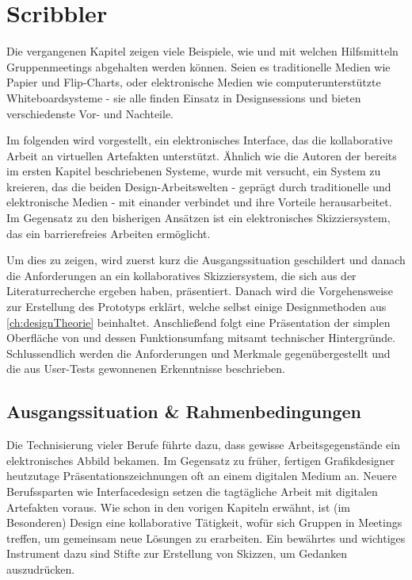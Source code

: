 \chapter{Scribbler}\label{ch:scribbler} 

Die vergangenen Kapitel zeigen viele Beispiele, wie und mit welchen Hilfsmitteln Gruppenmeetings abgehalten werden können. Seien es traditionelle Medien wie Papier und Flip-Charts, oder elektronische Medien wie computerunterstützte Whiteboardsysteme - sie alle finden Einsatz in Designsessions und bieten verschiedenste Vor- und Nachteile.

\medskip Im folgenden wird \scribbler vorgestellt, ein elektronisches Interface, das die kollaborative Arbeit an virtuellen Artefakten unterstützt. Ähnlich wie die Autoren der bereits im ersten Kapitel beschriebenen Systeme, wurde mit \scribbler versucht, ein System zu kreieren, das die beiden Design-Arbeitswelten - geprägt durch traditionelle und elektronische Medien - mit einander verbindet und ihre Vorteile herausarbeitet. Im Gegensatz zu den bisherigen Ansätzen ist \scribbler ein elektronisches Skizziersystem, das ein barrierefreies Arbeiten ermöglicht.

\medskip Um dies zu zeigen, wird zuerst kurz die Ausgangssituation geschildert und danach die Anforderungen an ein kollaboratives Skizziersystem, die sich aus der Literaturrecherche ergeben haben, präsentiert. Danach wird die Vorgehensweise zur Erstellung des Prototyps erklärt, welche selbst einige Designmethoden aus \autoref{ch:designTheorie} beinhaltet. Anschließend folgt eine Präsentation der simplen Oberfläche von \scribbler und dessen Funktionsumfang mitsamt technischer Hintergründe. Schlussendlich werden die Anforderungen und Merkmale gegenübergestellt und die aus User-Tests gewonnenen Erkenntnisse beschrieben.

\section{Ausgangssituation \& Rahmenbedingungen} \label{sec:ausgangssituation} 
Die Technisierung vieler Berufe führte dazu, dass gewisse Arbeitsgegenstände ein elektronisches Abbild bekamen. Im Gegensatz zu früher, fertigen Grafikdesigner heutzutage Präsentationszeichnungen oft an einem digitalen Medium an. Neuere Berufssparten wie Interfacedesign setzen die tagtägliche Arbeit mit digitalen Artefakten voraus. Wie schon in den vorigen Kapiteln erwähnt, ist (im Besonderen) Design eine kollaborative Tätigkeit, wofür sich Gruppen in Meetings treffen, um gemeinsam neue Lösungen zu erarbeiten. Ein bewährtes und wichtiges Instrument dazu sind Stifte zur Erstellung von Skizzen, um Gedanken auszudrücken.

